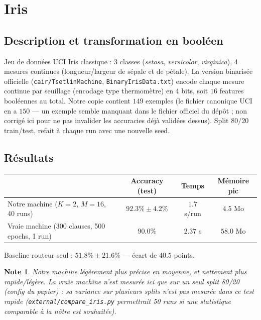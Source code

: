 \documentclass[12pt,a4paper]{article}
\newcommand{\code}[1]{\texttt{#1}}
\theoremstyle{plain}
\newtheorem{note}{Note}[section]
\begin{document}
\section{Iris}

\subsection{Description et transformation en bool\'een}

Jeu de donn\'ees UCI Iris classique : 3 classes (\emph{setosa}, \emph{versicolor}, \emph{virginica}), 4 mesures continues (longueur/largeur de s\'epale et de p\'etale). La version binaris\'ee officielle (\code{cair/TsetlinMachine}, \code{BinaryIrisData.txt}) encode chaque mesure continue par seuillage (encodage type thermom\`etre) en 4 bits, soit $16$ features bool\'eennes au total. Notre copie contient $149$ exemples (le fichier canonique UCI en a $150$ --- un exemple semble manquant dans le fichier officiel du d\'ep\^ot ; non corrig\'e ici pour ne pas invalider les accuracies d\'ej\`a valid\'ees dessus). Split $80/20$ train/test, refait \`a chaque run avec une nouvelle seed.

\subsection{R\'esultats}

\begin{center}
\renewcommand{\arraystretch}{1.3}
\begin{tabular}{lccc}
\toprule
 & \textbf{Accuracy (test)} & \textbf{Temps} & \textbf{M\'emoire pic} \\
\midrule
Notre machine ($K{=}2$, $M{=}16$, 40 runs)       & $92.3\% \pm 4.2\%$ & $1.7$ s/run   & $4.5$ Mo \\
Vraie machine (300 clauses, 500 epochs, 1 run)   & $90.0\%$           & $2.37$ s      & $58.0$ Mo \\
\bottomrule
\end{tabular}
\end{center}

\noindent\footnotesize Baseline routeur seul : $51.8\% \pm 21.6\%$ --- \'ecart de $40.5$ points.\normalsize

\begin{note}
Notre machine l\'eg\`erement plus pr\'ecise en moyenne, et nettement plus rapide/l\'eg\`ere. La vraie machine n'est mesur\'ee ici que sur \emph{un seul} split 80/20 (config du papier) : sa variance sur plusieurs splits n'est pas mesur\'ee dans ce test rapide (\code{external/compare\_iris.py} permettrait 50 runs si une statistique comparable \`a la n\^otre est souhait\'ee).
\end{note}
\end{document}
